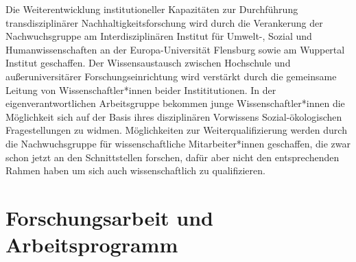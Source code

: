 \documentclass[a4paper,11pt,twoside]{scrartcl}
\begin{document}
Die Weiterentwicklung institutioneller Kapazitäten zur Durchführung transdisziplinärer Nachhaltigkeitsforschung wird durch die Verankerung der Nachwuchsgruppe am Interdisziplinären Institut für Umwelt-, Sozial und Humanwissenschaften an der Europa-Universität Flensburg sowie am Wuppertal Institut geschaffen. Der Wissensaustausch zwischen Hochschule und außeruniversitärer Forschungseinrichtung wird verstärkt durch die gemeinsame Leitung von Wissenschaftler*innen beider Instititutionen. In der eigenverantwortlichen Arbeitsgruppe bekommen junge Wissenschaftler*innen die Möglichkeit sich auf der Basis ihres disziplinären Vorwissens Sozial-ökologischen Fragestellungen zu widmen. Möglichkeiten zur Weiterqualifizierung werden durch die Nachwuchsgruppe für wissenschaftliche Mitarbeiter*innen geschaffen, die zwar schon jetzt an den Schnittstellen forschen, dafür aber nicht den entsprechenden Rahmen haben um sich auch wissenschaftlich zu qualifizieren.

\section{Forschungsarbeit und Arbeitsprogramm}
\label{sec:4}

\end{document}
